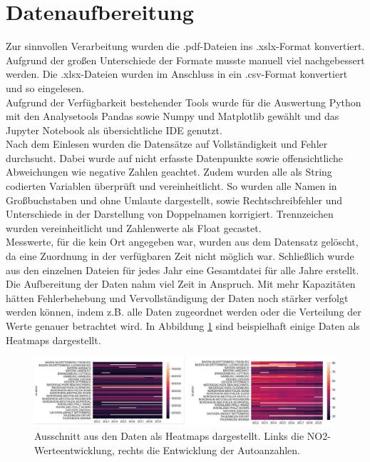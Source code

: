 \documentclass[11pt,a4paper,oneside,german]{article}
\begin{document}
	\section{Datenaufbereitung}
	
	Zur sinnvollen Verarbeitung wurden die .pdf-Dateien ins .xslx-Format konvertiert. Aufgrund der großen Unterschiede der Formate musste manuell viel nachgebessert werden. Die .xlsx-Dateien wurden im Anschluss in ein .csv-Format konvertiert und so eingelesen.\\
	Aufgrund der Verfügbarkeit bestehender Tools wurde für die Auswertung Python mit den Analysetools Pandas sowie Numpy und Matplotlib gewählt und das Jupyter Notebook als übersichtliche IDE genutzt.\\
	Nach dem Einlesen wurden die Datensätze auf Vollständigkeit und Fehler durchsucht. Dabei wurde auf nicht erfasste Datenpunkte sowie offensichtliche Abweichungen wie negative Zahlen geachtet. Zudem wurden alle als String codierten Variablen überprüft und vereinheitlicht. So wurden alle Namen in Großbuchstaben und ohne Umlaute dargestellt, sowie Rechtschreibfehler und Unterschiede in der Darstellung von Doppelnamen korrigiert. Trennzeichen wurden vereinheitlicht und Zahlenwerte als Float gecastet. \\
	Messwerte, für die kein Ort angegeben war, wurden aus dem Datensatz gelöscht, da eine Zuordnung in der verfügbaren Zeit nicht möglich war. Schließlich wurde aus den einzelnen Dateien für jedes Jahr eine Gesamtdatei für alle Jahre erstellt. \\
	Die Aufbereitung der Daten nahm viel Zeit in Anspruch. Mit mehr Kapazitäten hätten Fehlerbehebung und Vervollständigung der Daten noch stärker verfolgt werden können, indem z.B. alle Daten zugeordnet werden oder die Verteilung der Werte genauer betrachtet wird. In Abbildung \ref{fig:Heatmaps} sind beispielhaft einige Daten als Heatmaps dargestellt.
	
	\begin{figure}[h!]
		\centering
		\includegraphics[width=12cm]{Heatmaps.png}
		\caption{Ausschnitt aus den Daten als Heatmaps dargestellt. Links die NO2-Werteentwicklung, rechts die Entwicklung der Autoanzahlen.}
		\label{fig:Heatmaps}
	\end{figure}
	
\end{document}

